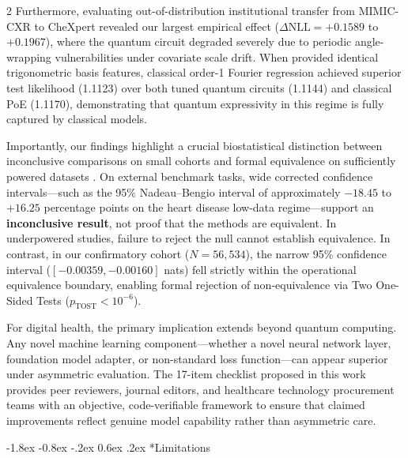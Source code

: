 \documentclass[10pt,a4paper,twoside]{article}
\makeatletter
\renewcommand{\subsection}{\@startsection{subsection}{2}{\z@}%
  {-1.8ex \@plus -0.8ex \@minus -.2ex}%
  {0.6ex \@plus.2ex}%
  {\normalfont\normalsize\sffamily\bfseries\color{naturedark}}}
\makeatother
\begin{document}
\begin{multicols}{2}
Furthermore, evaluating out-of-distribution institutional transfer from MIMIC-CXR to CheXpert revealed our largest empirical effect ($\Delta\text{NLL} = +0.1589$ to $+0.1967$), where the quantum circuit degraded severely due to periodic angle-wrapping vulnerabilities under covariate scale drift. When provided identical trigonometric basis features, classical order-1 Fourier regression achieved superior test likelihood (1.1123) over both tuned quantum circuits (1.1144) and classical PoE (1.1170), demonstrating that quantum expressivity in this regime is fully captured by classical models.

Importantly, our findings highlight a crucial biostatistical distinction between inconclusive comparisons on small cohorts and formal equivalence on sufficiently powered datasets \cite{altman1995}. On external benchmark tasks, wide corrected confidence intervals---such as the 95\% Nadeau--Bengio interval of approximately $-18.45$ to $+16.25$ percentage points on the heart disease low-data regime---support an \textbf{inconclusive result}, not proof that the methods are equivalent. In underpowered studies, failure to reject the null cannot establish equivalence. In contrast, in our confirmatory cohort ($N = 56,534$), the narrow 95\% confidence interval ($[-0.00359, -0.00160]$ nats) fell strictly within the operational equivalence boundary, enabling formal rejection of non-equivalence via Two One-Sided Tests ($p_{\text{TOST}} < 10^{-6}$).

For digital health, the primary implication extends beyond quantum computing. Any novel machine learning component---whether a novel neural network layer, foundation model adapter, or non-standard loss function---can appear superior under asymmetric evaluation. The 17-item checklist proposed in this work provides peer reviewers, journal editors, and healthcare technology procurement teams with an objective, code-verifiable framework to ensure that claimed improvements reflect genuine model capability rather than asymmetric care.

\subsection*{Limitations}


\end{multicols}
\end{document}
